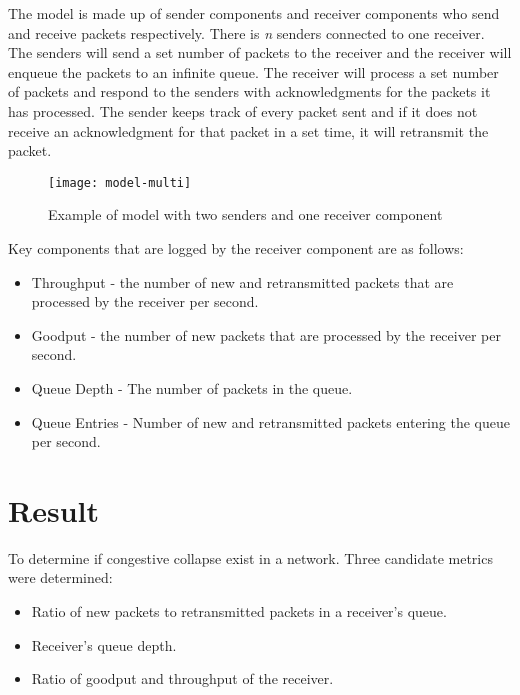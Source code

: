 \documentclass{article}
\begin{document}
The model is made up of sender components and receiver components who send and receive packets respectively. There is \textit{n} senders connected to one receiver. The senders will send a set number of packets to the receiver and the receiver will enqueue the packets to an infinite queue. The receiver will process a set number of packets and respond to the senders with acknowledgments for the packets it has processed. The sender keeps track of every packet sent and if it does not receive an acknowledgment for that packet in a set time, it will retransmit the packet.

\begin{figure}[H]
	\texttt{[image: model-multi]}
	\centering
	\caption{Example of model with two senders and one receiver component}
\end{figure}

Key components that are logged by the receiver component are as follows:

\begin{itemize}
	\item Throughput - the number of new and retransmitted packets that are processed by the receiver per second.
	\item Goodput - the number of new packets that are processed by the receiver per second.
	\item Queue Depth - The number of packets in the queue.
	\item Queue Entries - Number of new and retransmitted packets entering the queue per second.
\end{itemize}


\section{Result} %

To determine if congestive collapse exist in a network. Three candidate metrics were determined:

\begin{itemize}
	\item Ratio of new packets to retransmitted packets in a receiver's queue.
	\item Receiver's queue depth.
	\item Ratio of goodput and throughput of the receiver.
\end{itemize}
\end{document}
